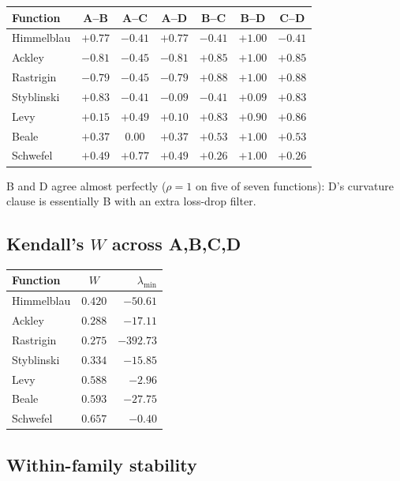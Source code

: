\documentclass[11pt]{article}
\begin{document}
\begin{center}
\small
\begin{tabular}{lcccccc}
\toprule
Function & A--B & A--C & A--D & B--C & B--D & C--D \\
\midrule
Himmelblau & $+0.77$ & $-0.41$ & $+0.77$ & $-0.41$ & $+1.00$ & $-0.41$ \\
Ackley     & $-0.81$ & $-0.45$ & $-0.81$ & $+0.85$ & $+1.00$ & $+0.85$ \\
Rastrigin  & $-0.79$ & $-0.45$ & $-0.79$ & $+0.88$ & $+1.00$ & $+0.88$ \\
Styblinski & $+0.83$ & $-0.41$ & $-0.09$ & $-0.41$ & $+0.09$ & $+0.83$ \\
Levy       & $+0.15$ & $+0.49$ & $+0.10$ & $+0.83$ & $+0.90$ & $+0.86$ \\
Beale      & $+0.37$ & $0.00$  & $+0.37$ & $+0.53$ & $+1.00$ & $+0.53$ \\
Schwefel   & $+0.49$ & $+0.77$ & $+0.49$ & $+0.26$ & $+1.00$ & $+0.26$ \\
\bottomrule
\end{tabular}
\end{center}

B and D agree almost perfectly ($\rho=1$ on five of seven functions): D's
curvature clause is essentially B with an extra loss-drop filter.

\subsection{Kendall's $W$ across A,B,C,D}

\begin{center}
\begin{tabular}{lcr}
\toprule
Function & $W$ & $\lambda_{\min}$ \\
\midrule
Himmelblau & $0.420$ & $-50.61$ \\
Ackley     & $0.288$ & $-17.11$ \\
Rastrigin  & $0.275$ & $-392.73$ \\
Styblinski & $0.334$ & $-15.85$ \\
Levy       & $0.588$ & $-2.96$ \\
Beale      & $0.593$ & $-27.75$ \\
Schwefel   & $0.657$ & $-0.40$ \\
\bottomrule
\end{tabular}
\end{center}

\subsection{Within-family stability}
\end{document}
